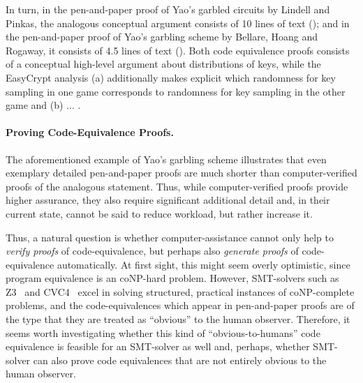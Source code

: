 In turn, in the pen-and-paper proof of Yao's garbled circuits by Lindell and Pinkas, the analogous conceptual argument consists of 10 lines of text (\cite[page 23]{X}); and in the pen-and-paper proof of Yao's garbling scheme by Bellare, Hoang and Rogaway, it consists of 4.5 lines of text (\cite[bottom of page 22]{X}). Both code equivalence proofs consists of a conceptual high-level argument about distributions of keys, while the EasyCrypt analysis (a) additionally makes explicit which randomness for key sampling in one game corresponds to randomness for key sampling in the other game and (b) ... .

\paragraph{Proving Code-Equivalence Proofs.}
The aforementioned example of Yao's garbling scheme illustrates that even
exemplary detailed pen-and-paper proofs are much shorter than computer-verified
proofs of the analogous statement. Thus, while computer-verified proofs provide
higher assurance, they also require significant additional detail and, in their
current state, cannot be said to reduce workload, but rather increase it.


Thus, a natural question is whether computer-assistance cannot only help to
\emph{verify proofs} of code-equivalence, but perhaps also 
\emph{generate proofs} of code-equivalence automatically. At first sight,
this might seem overly optimistic, since program equivalence is an coNP-hard problem.
However, SMT-solvers such as Z3~\cite{X} and CVC4~\cite{X} excel in 
solving structured, practical instances of coNP-complete problems, and
the code-equivalences which appear in pen-and-paper proofs are of the type that 
they are treated as ``obvious'' to the human observer. Therefore, it seems
worth investigating whether this kind of ``obvious-to-humans'' code equivalence
is feasible for an SMT-solver as well and, perhaps, whether SMT-solver can also prove code equivalences that are not entirely obvious to the human observer.



